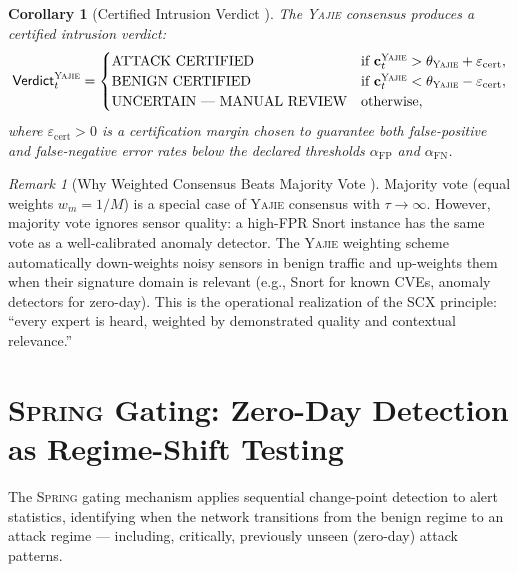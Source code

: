 \documentclass[11pt,a4paper]{article}
\newtheorem{corollary}[theorem]{Corollary}
\theoremstyle{definition}
\theoremstyle{remark}
\newtheorem{remark}[theorem]{Remark}
\newcommand{\Yajie}{\textsc{Yajie}}
\newcommand{\Spring}{\textsc{Spring}}
\newcommand{\FP}{\mathrm{FP}}
\newcommand{\FN}{\mathrm{FN}}
\begin{document}
\begin{corollary}[Certified Intrusion Verdict ]
\label{cor:certified_verdict}
The \Yajie{} consensus produces a certified intrusion verdict:
\begin{equation}
\mathsf{Verdict}_t^{\Yajie} =
\begin{cases}
\text{ATTACK CERTIFIED} & \text{if } \mathbf{c}_t^{\Yajie} > \theta_{\Yajie} + \varepsilon_{\mathrm{cert}}, \\
\text{BENIGN CERTIFIED} & \text{if } \mathbf{c}_t^{\Yajie} < \theta_{\Yajie} - \varepsilon_{\mathrm{cert}}, \\
\text{UNCERTAIN — MANUAL REVIEW} & \text{otherwise},
\end{cases}
\label{eq:verdict}
\end{equation}
where $\varepsilon_{\mathrm{cert}} > 0$ is a certification margin chosen to guarantee both false-positive and false-negative error rates below the declared thresholds $\alpha_{\FP}$ and $\alpha_{\FN}$.
\end{corollary}

\begin{remark}[Why Weighted Consensus Beats Majority Vote ]
\label{rem:weighted_consensus}
Majority vote (equal weights $w_m = 1/M$) is a special case of \Yajie{} consensus with $\tau \to \infty$. However, majority vote ignores sensor quality: a high-FPR Snort instance has the same vote as a well-calibrated anomaly detector. The \Yajie{} weighting scheme automatically down-weights noisy sensors in benign traffic and up-weights them when their signature domain is relevant (e.g., Snort for known CVEs, anomaly detectors for zero-day). This is the operational realization of the SCX principle: ``every expert is heard, weighted by demonstrated quality and contextual relevance.''
\end{remark}

\section{\Spring{} Gating: Zero-Day Detection as Regime-Shift Testing }
\label{sec:spring}

The \Spring{} gating mechanism applies sequential change-point detection to alert statistics, identifying when the network transitions from the benign regime to an attack regime — including, critically, previously unseen (zero-day) attack patterns.
\end{document}
